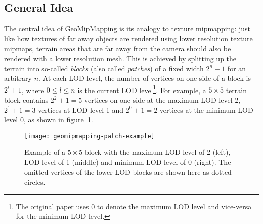 \subsection{General Idea}
The central idea of GeoMipMapping is its analogy to texture mipmapping: just like how textures of far away objects are rendered using lower resolution texture mipmaps,
terrain areas that are far away from the camera should also be rendered with a lower resolution mesh.
This is achieved by splitting up the terrain into so-called \textit{blocks} (also called \textit{patches}) of a fixed width $2^n + 1$ for an arbitrary $n$.
At each LOD level, the number of vertices on one side of a block is $2^{l}+1$, where $0\leq l \leq n$ is the current LOD level\footnote{The original paper uses 0 to denote the maximum LOD level and vice-versa for the minimum LOD level. }.
For example, a $5 \times 5$ terrain block contains $2^2 + 1 = 5$ vertices on one side at the maximum LOD level 2, $2^1 + 1 = 3$ vertices at LOD level 1 and $2^0 + 1 = 2$ vertices at the minimum LOD level 0, as
shown in figure~\ref{fig:geomipmapping-patch-example}.


\begin{figure}
  \centering
  \texttt{[image: geomipmapping-patch-example]}
  \caption{Example of a $5 \times 5$ block with the maximum LOD level of 2 (left), LOD level of 1 (middle) and minimum LOD level of 0 (right). The omitted vertices of the lower LOD blocks are shown here as dotted circles.}\label{fig:geomipmapping-patch-example}
\end{figure}




